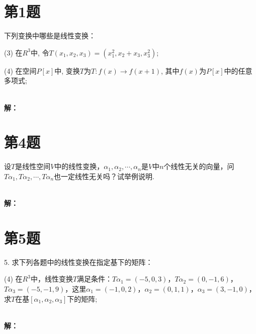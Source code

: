 \documentclass[a4paper, 12pt]{ctexart}
\begin{document}
\makeHomeworkTitle


\section{第1题}

\begin{exercise}
下列变换中哪些是线性变换：

(3) 在$R^{3}$中, 令$T(x_1,x_2,x_3)=(x_1^2,x_2+x_3,x_3^2)$;

(4) 在空间$P[x]$中, 变换$T$为$T:f(x) \to f(x+1)$, 其中$f(x)$为$P[x]$中的任意多项式;
\end{exercise}~\\

\noindent\textbf{解：}\\


\section{第4题}
\begin{exercise}
设$T$是线性空间$V$中的线性变换，$\alpha_{1},\alpha_{2},\cdots,\alpha_{n}$是$V$中$n$个线性无关的向量，问$T\alpha_{1},T\alpha_{2},\cdots,T\alpha_{n}$也一定线性无关吗？试举例说明.
\end{exercise}~\\
\noindent\textbf{解：}~\\

\section{第5题}
\begin{exercise}
5. 求下列各题中的线性变换在指定基下的矩阵：

(4) 在$R^{3}$中，线性变换$T$满足条件：$T\alpha_{1}=(-5,0,3)$，$T\alpha_{2}=(0,-1,6)$，$T\alpha_{3}=(-5,-1,9)$，这里$\alpha_{1}=(-1,0,2)$，$\alpha_{2}=(0,1,1)$，$\alpha_{3}=(3,-1,0)$，求$T$在基$[\alpha_{1},\alpha_{2},\alpha_{3}]$下的矩阵;
\end{exercise}~\\
\noindent\textbf{解：}\\
\end{document}
